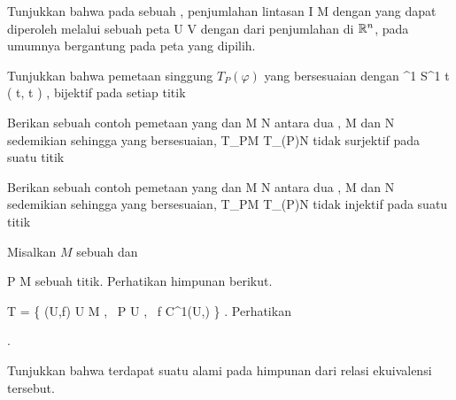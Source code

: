 {}
{

Tunjukkan bahwa pada sebuah
, penjumlahan lintasan
 { I } { M
} {}
dengan
 yang dapat diperoleh melalui sebuah peta
\maabbdisp {\alpha} { U } { V
} {}
dengan
 dari penjumlahan di ${\mathbb R}^n$, pada umumnya bergantung pada peta yang dipilih.

}
{} {}

{}
{

Tunjukkan bahwa pemetaan singgung $T_P(\varphi)$ yang bersesuaian dengan
\maabbeledisp {\varphi} {\R^1} {S^1
} { t } {( \cos  t, \sin  t  )
} {,}
bijektif pada setiap titik

}
{} {}

{}
{

Berikan sebuah contoh pemetaan yang
dan
\maabbdisp {\varphi} { M } { N
} {}
antara dua
,
\mathkor {} {M} {dan} {N} {}
sedemikian sehingga
yang bersesuaian,
 {T_PM} {T_{\varphi(P)}N
} {}
tidak surjektif pada suatu titik

}
{} {}

{}
{

Berikan sebuah contoh pemetaan yang
dan
\maabbdisp {\varphi} { M } { N
} {}
antara dua
,
\mathkor {} {M} {dan} {N} {}
sedemikian sehingga
yang bersesuaian,
 {T_PM} {T_{\varphi(P)}N
} {}
tidak injektif pada suatu titik

}
{} {}

{}
{

Misalkan $M$ sebuah
dan

\mavergleichskette
{\vergleichskette
{ P
}
{ \in }{ M
}
{  }{
}
{    }{
}
{   }{
}
}
{}{}{}
sebuah titik. Perhatikan himpunan berikut.

\mavergleichskettedisp
{\vergleichskette
{ T
}
{ =} { \left\{  (U,f)   \mid   U \subseteq M  , \,  P \in U   , \,  f \in C^1(U,\R)    \right\}
}
{ } {
}
{ } {
}
{ } {
}
}
{}{}{.}
Perhatikan

 { . }

 {Tunjukkan bahwa terdapat suatu
alami pada himpunan
dari relasi ekuivalensi tersebut.
}

}
{} {}

